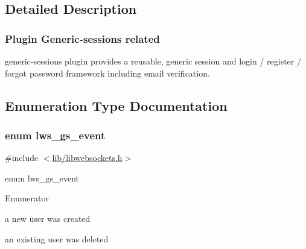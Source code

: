\subsection{Detailed Description}
\subsubsection*{Plugin Generic-\/sessions related}

generic-\/sessions plugin provides a reusable, generic session and login / register / forgot password framework including email verification. 

\subsection{Enumeration Type Documentation}
\subsubsection[{\texorpdfstring{lws\+\_\+gs\+\_\+event}{lws\_gs\_event}}]{\setlength{\rightskip}{0pt plus 5cm}enum {\bf lws\+\_\+gs\+\_\+event}}\hypertarget{group__generic-sessions_gaa93946b3d921072209d5cd8cdfa5332e}{}\label{group__generic-sessions_gaa93946b3d921072209d5cd8cdfa5332e}


{\ttfamily \#include $<$\hyperlink{libwebsockets_8h}{lib/libwebsockets.\+h}$>$}

enum lws\+\_\+gs\+\_\+event \begin{Desc}
\item[Enumerator]\par
\begin{description}
\item[{\em 
L\+W\+S\+G\+S\+E\+\_\+\+C\+R\+E\+A\+T\+ED\hypertarget{group__generic-sessions_ggaa93946b3d921072209d5cd8cdfa5332ea596010a165bf13473c5eea3a34cd4308}{}\label{group__generic-sessions_ggaa93946b3d921072209d5cd8cdfa5332ea596010a165bf13473c5eea3a34cd4308}
}]a new user was created \item[{\em 
L\+W\+S\+G\+S\+E\+\_\+\+D\+E\+L\+E\+T\+ED\hypertarget{group__generic-sessions_ggaa93946b3d921072209d5cd8cdfa5332ead908cdc5689c5d22c9d3c8934e94dcde}{}\label{group__generic-sessions_ggaa93946b3d921072209d5cd8cdfa5332ead908cdc5689c5d22c9d3c8934e94dcde}
}]an existing user was deleted \end{description}
\end{Desc}

